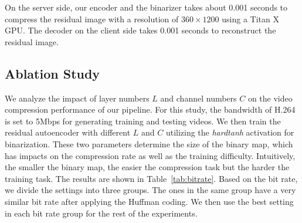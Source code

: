 \documentclass[letterpaper]{article} %
\begin{document}
	{} On the server side, our encoder and the binarizer takes about 0.001 seconds to compress the residual image with a resolution of $360 \times 1200$ using a Titan X GPU. The decoder on the client side takes 0.001 seconds to reconstruct the residual image. %
	
	\subsection{Ablation Study}
	
	{} We analyze the impact of layer numbers $L$ and channel numbers $C$ on the video compression performance of our pipeline. For this study, the bandwidth of H.264 is set to 5Mbps for generating training and testing videos. We then train the residual autoencoder with different $L$ and $C$ utilizing the \textit{hardtanh} activation for binarization. These two parameters determine the size of the binary map, which has impacts on the compression rate as well as the training difficulty. Intuitively, the smaller the binary map, the easier the compression task but the harder the training task. The results are shown in Table~\ref{tab:bitrate}. Based on the bit rate, we divide the settings into three groups. The ones in the same group have a very similar bit rate after applying the Huffman coding. We then use the best setting in each bit rate group for the rest of the experiments.
	
\end{document}
